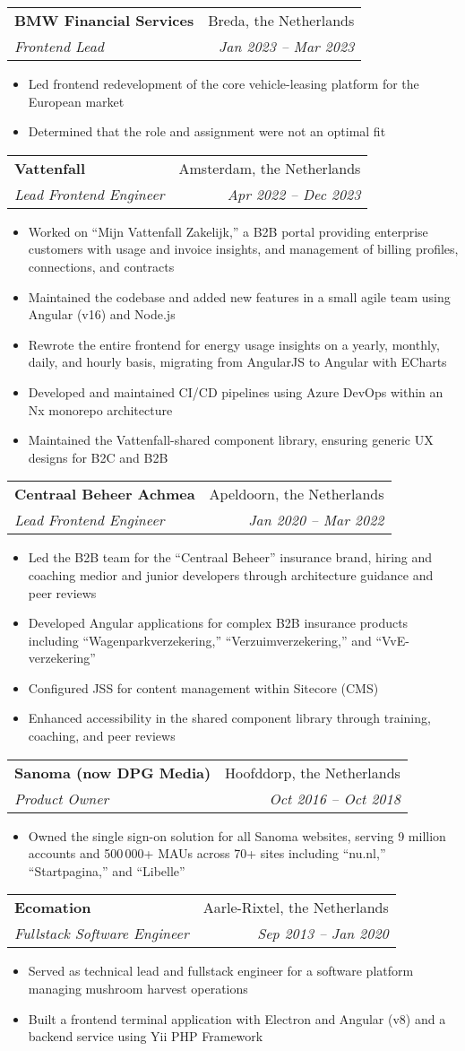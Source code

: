 \documentclass[letterpaper,11pt]{article}
\makeatletter
\newcommand{\resumeItem}[1]{
  \item\small{
    {#1 \vspace{-2pt}}
  }
}
\newcommand{\resumeSubheading}[4]{
  \vspace{-2pt}\item
    \begin{tabular*}{0.97\textwidth}[t]{l@{\extracolsep{\fill}}r}
      \textbf{#1} & #2 \\
      \textit{\small#3} & \textit{\small #4} \\
    \end{tabular*}\vspace{-7pt}
}
\newcommand{\resumeItemListStart}{\begin{itemize}}
\newcommand{\resumeItemListEnd}{\end{itemize}\vspace{-5pt}}
\makeatother
\begin{document}
    \resumeSubheading
      {BMW Financial Services}{Breda, the Netherlands}
      {Frontend Lead}{Jan 2023 -- Mar 2023}
        \resumeItemListStart
          \resumeItem{Led frontend redevelopment of the core vehicle-leasing platform for the European market}
          \resumeItem{Determined that the role and assignment were not an optimal fit}
        \resumeItemListEnd

    \resumeSubheading
      {Vattenfall}{Amsterdam, the Netherlands}
      {Lead Frontend Engineer}{Apr 2022 -- Dec 2023}
        \resumeItemListStart
          \resumeItem{Worked on “Mijn Vattenfall Zakelijk,” a B2B portal providing enterprise customers with usage and invoice insights, and management of billing profiles, connections, and contracts}
          \resumeItem{Maintained the codebase and added new features in a small agile team using Angular (v16) and Node.js}
          \resumeItem{Rewrote the entire frontend for energy usage insights on a yearly, monthly, daily, and hourly basis, migrating from AngularJS to Angular with ECharts}
          \resumeItem{Developed and maintained CI/CD pipelines using Azure DevOps within an Nx monorepo architecture}
          \resumeItem{Maintained the Vattenfall-shared component library, ensuring generic UX designs for B2C and B2B}
        \resumeItemListEnd

    \resumeSubheading
      {Centraal Beheer Achmea}{Apeldoorn, the Netherlands}
      {Lead Frontend Engineer}{Jan 2020 -- Mar 2022}
        \resumeItemListStart
          \resumeItem{Led the B2B team for the “Centraal Beheer” insurance brand, hiring and coaching medior and junior developers through architecture guidance and peer reviews}
          \resumeItem{Developed Angular applications for complex B2B insurance products including “Wagenparkverzekering,” “Verzuimverzekering,” and “VvE-verzekering”}
          \resumeItem{Configured JSS for content management within Sitecore (CMS)}
          \resumeItem{Enhanced accessibility in the shared component library through training, coaching, and peer reviews}
        \resumeItemListEnd

    \resumeSubheading
      {Sanoma (now DPG Media)}{Hoofddorp, the Netherlands}
      {Product Owner}{Oct 2016 -- Oct 2018}
        \resumeItemListStart
          \resumeItem{Owned the single sign-on solution for all Sanoma websites, serving 9 million accounts and 500\,000+ MAUs across 70+ sites including “nu.nl,” “Startpagina,” and “Libelle”}
        \resumeItemListEnd

    \resumeSubheading
      {Ecomation}{Aarle-Rixtel, the Netherlands}
      {Fullstack Software Engineer}{Sep 2013 -- Jan 2020}
        \resumeItemListStart
          \resumeItem{Served as technical lead and fullstack engineer for a software platform managing mushroom harvest operations}
          \resumeItem{Built a frontend terminal application with Electron and Angular (v8) and a backend service using Yii PHP Framework}
        \resumeItemListEnd
\end{document}
